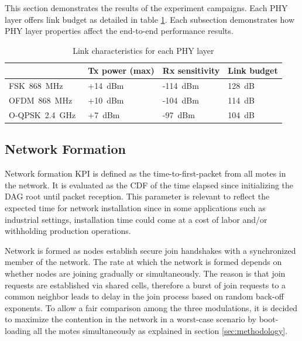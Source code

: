 \documentclass[journal,article,submit,moreauthors,pdftex]{Definitions/mdpi}
\newcommand{\fsk}          {FSK~868~MHz}
\newcommand{\oqpsk}        {O-QPSK~2.4~GHz}
\newcommand{\ofdm}         {OFDM~868~MHz}
\begin{document}
This section demonstrates the results of the experiment campaigns.
Each PHY layer offers link budget as detailed in table \ref{tab:linkbudget}. 
Each subsection demonstrates how PHY layer properties affect the end-to-end performance results. 

\begin{table}[t]
\centering
\caption{Link characteristics for each PHY layer}
\begin{tabular}{|l|l|l|l|}
\hline
        &  Tx power (max) & Rx sensitivity & Link budget \\ \hline
\fsk\   & +14~dBm      & -114~dBm             & 128~dB      \\ \hline
\ofdm\  & +10~dBm      & -104~dBm             & 114~dB      \\ \hline
\oqpsk\ & +7~dBm       & -97~dBm              & 104~dB      \\ \hline
\end{tabular}
\label{tab:linkbudget}
\end{table}

\subsection{Network Formation}
\label{sec:network_formation}


Network formation KPI is defined as the time-to-first-packet  from all motes in the network.
It is evaluated as the CDF of the time elapsed since initializing the DAG root until packet reception. 
This parameter is relevant to reflect the expected time for network installation since in some applications such as industrial settings, installation time could come at a cost of labor and/or withholding production operations.


Network is formed as nodes establish secure join handshakes with a synchronized member of the network.
The rate at which the network is formed depends on whether nodes are joining gradually or  simultaneously.
The reason is that join requests are established via shared cells, therefore a burst of join requests to a common neighbor leads to delay in the join process based on random back-off exponents. 
To allow a fair comparison among the three modulations, it is decided to maximize the contention in the network in a worst-case scenario by boot-loading all the motes simultaneously as explained in section \ref{sec:methodology}.
\end{document}

